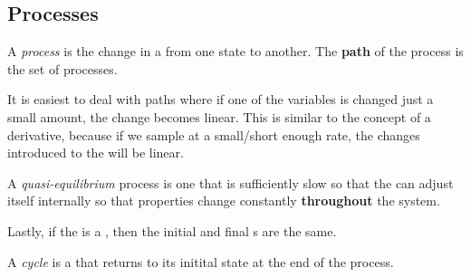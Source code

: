 \subsection{Processes}\label{subsec:Processes}
\begin{definition}[Process]\label{def:Process}
  A \emph{process} is the change in a  from one  state to another.
  The \textbf{path} of the process is the set of  processes.

  It is easiest to deal with paths where if one of the variables is changed just a small amount, the change becomes linear.
  This is similar to the concept of a derivative, because if we sample at a small/short enough rate, the changes introduced to the  will be linear.
\end{definition}

\begin{definition}\label{def:Quasi-equilibrium}
  A \emph{quasi-equilibrium} process is one that is sufficiently slow so that the  can adjust itself internally so that properties change constantly \textbf{throughout} the system.
\end{definition}

Lastly, if the  is a , then the initial and final s are the same.
\begin{definition}[Cycle]\label{def:Cycle}
  A \emph{cycle} is a  that returns to its initital state at the end of the process.
\end{definition}


